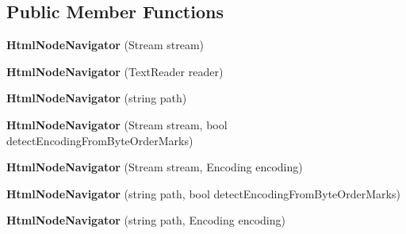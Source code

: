 \subsection*{Public Member Functions}
\begin{DoxyCompactItemize}
\item 
\mbox{\label{class_html_agility_pack_1_1_html_node_navigator_aecbd88a04f3d05a10f6a489098973ab6}} 
{\bfseries Html\+Node\+Navigator} (Stream stream)
\item 
\mbox{\label{class_html_agility_pack_1_1_html_node_navigator_ac81f609b7631365884c346ee186457cd}} 
{\bfseries Html\+Node\+Navigator} (Text\+Reader reader)
\item 
\mbox{\label{class_html_agility_pack_1_1_html_node_navigator_add1218ba51639a54431ede39675372cb}} 
{\bfseries Html\+Node\+Navigator} (string path)
\item 
\mbox{\label{class_html_agility_pack_1_1_html_node_navigator_a7c91f826d5207f21a16645d029672127}} 
{\bfseries Html\+Node\+Navigator} (Stream stream, bool detect\+Encoding\+From\+Byte\+Order\+Marks)
\item 
\mbox{\label{class_html_agility_pack_1_1_html_node_navigator_a1893182fcc1c74178ceae9ca90c46635}} 
{\bfseries Html\+Node\+Navigator} (Stream stream, Encoding encoding)
\item 
\mbox{\label{class_html_agility_pack_1_1_html_node_navigator_a4a9fc87feeb9b40279617d0da6a4928f}} 
{\bfseries Html\+Node\+Navigator} (string path, bool detect\+Encoding\+From\+Byte\+Order\+Marks)
\item 
\mbox{\label{class_html_agility_pack_1_1_html_node_navigator_ad52432337d1fcab9bd3cd5c869c96414}} 
{\bfseries Html\+Node\+Navigator} (string path, Encoding encoding)
\item 
\mbox{\label{class_html_agility_pack_1_1_html_node_navigator_afcb924ba8473a179b378a5de93653e53}} 

\end{DoxyCompactItemize}
